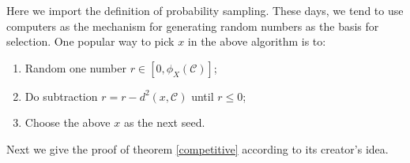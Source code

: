          Here we import the definition of probability sampling. These days, we tend to use computers as the mechanism for generating random numbers as the basis for selection. One popular way to pick $x$ in the above algorithm is to:
         \begin{enumerate} [1.]
         \item Random one number $r \in [0, \phi_{X}(\mathcal{C})]$; 
         \item Do subtraction $r = r - d^{2}(x, \mathcal{C})$ until $r \leq 0$;
         \item Choose the above $x$ as the next seed.
         \end{enumerate}
         
         Next we give the proof of theorem \ref{competitive} according to its creator's idea\cite{kmeansplus}.
         

